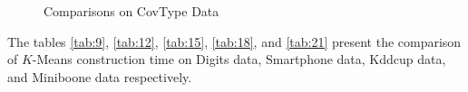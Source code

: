 \documentclass[runningheads]{llncs}
\begin{document}
\begin{figure}[!hbt]
	\hspace{0mm}
	\hspace{0mm}
	\caption{Comparisons on CovType Data }
	\label{fig:5}     
\end{figure}

The tables \ref{tab:9}, \ref{tab:12}, \ref{tab:15}, \ref{tab:18}, and \ref{tab:21} present the comparison of $K$-Means construction time on Digits data, Smartphone data, Kddcup data, and Miniboone data respectively.

\end{document}
